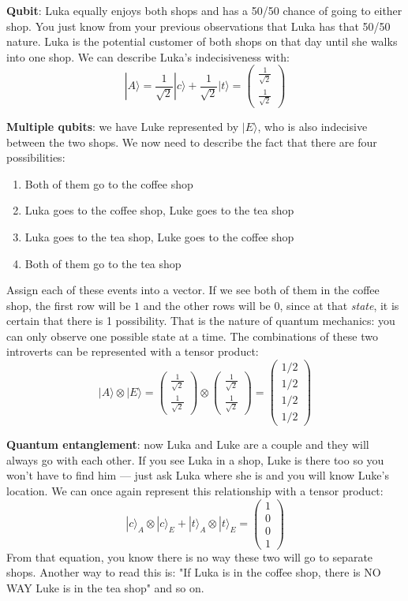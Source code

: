 \textbf{Qubit}: Luka equally enjoys both shops and has a 50/50 chance of going to either shop. You just know from your previous observations that Luka has that 50/50 nature. Luka is the potential customer of both shops on that day until she walks into one shop. We can describe Luka's indecisiveness with:
\[
    |A\rangle 
    = \frac{1}{\sqrt{2}}|c\rangle + \frac{1}{\sqrt{2}}|t\rangle
    = \begin{pmatrix}
        \frac{1}{\sqrt{2}} \\
        \frac{1}{\sqrt{2}}
    \end{pmatrix}
\]

\textbf{Multiple qubits}: we have Luke represented by $|E\rangle$, who is also indecisive between the two shops. We now need to describe the fact that there are four possibilities:
\begin{enumerate}
    \item Both of them go to the coffee shop
    \item Luka goes to the coffee shop, Luke goes to the tea shop
    \item Luka goes to the tea shop, Luke goes to the coffee shop
    \item Both of them go to the tea shop
\end{enumerate}
Assign each of these events into a vector. If we see both of them in the coffee shop, the first row will be $1$ and the other rows will be $0$, since at that \textit{state}, it is certain that there is 1 possibility. That is the nature of quantum mechanics: you can only observe one possible state at a time. The combinations of these two introverts can be represented with a tensor product:
\[
    |A\rangle \otimes |E\rangle
    = \begin{pmatrix}
        \frac{1}{\sqrt{2}} \\
        \frac{1}{\sqrt{2}}
    \end{pmatrix} \otimes \begin{pmatrix}
        \frac{1}{\sqrt{2}} \\
        \frac{1}{\sqrt{2}}
    \end{pmatrix}
    = \begin{pmatrix}
        1/2 \\ 1/2 \\ 1/2 \\ 1/2
    \end{pmatrix}
\]

\textbf{Quantum entanglement}: now Luka and Luke are a couple and they will always go with each other. If you see Luka in a shop, Luke is there too so you won't have to find him — just ask Luka where she is and you will know Luke's location. We can once again represent this relationship with a tensor product:
\[
    |c\rangle_A \otimes |c\rangle_E
        + |t\rangle_A \otimes |t\rangle_E
    = \begin{pmatrix} 1 \\ 0 \\ 0 \\ 1 \end{pmatrix}
\]
From that equation, you know there is no way these two will go to separate shops. Another way to read this is: "If Luka is in the coffee shop, there is NO WAY Luke is in the tea shop" and so on.

